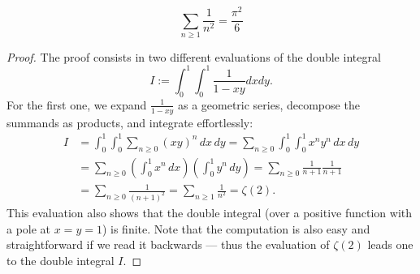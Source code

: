 \begin{theorem}
  \label{euler_series}
  \leanok
  \[
  \sum_{n \ge 1} \frac{1}{n^2} = \frac{\pi^2}{6}
  \]
\end{theorem}
\begin{proof}
  The proof consists in two different evaluations of the double integral
  \[
  I := \int_0^1 \int_0^1 \frac{1}{1-xy} dx dy.
  \]
  For the first one, we expand $\frac{1}{1-xy}$ as a geometric series, decompose the summands as products, and integrate effortlessly:
  \begin{align*}
  I &= \int_0^1 \int_0^1 \sum_{n \ge 0} (xy)^n \, dx \, dy = \sum_{n \ge 0} \int_0^1 \int_0^1 x^n y^n \, dx \, dy \\
  &= \sum_{n \ge 0} \left(\int_0^1 x^n \, dx\right) \left(\int_0^1 y^n \, dy\right) = \sum_{n \ge 0} \frac{1}{n+1} \frac{1}{n+1} \\
  &= \sum_{n \ge 0} \frac{1}{(n+1)^2} = \sum_{n \ge 1} \frac{1}{n^2} = \zeta(2).
  \end{align*}
  This evaluation also shows that the double integral (over a positive function with a pole at $x=y=1$) is finite.
  Note that the computation is also easy and straightforward if we read it backwards
  --- thus the evaluation of $\zeta(2)$ leads one to the double integral $I$.
  

\end{proof}
